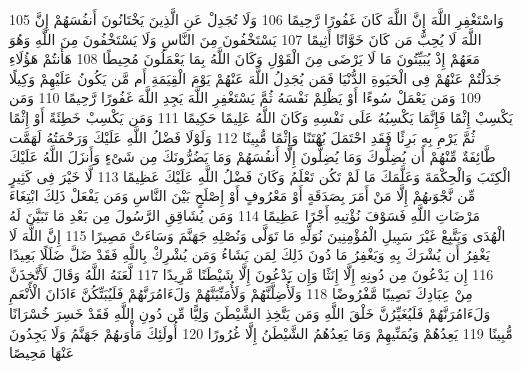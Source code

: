 {\tiny\colorbox{cl_aya}{105}} وَاسْتَغْفِرِ اللَّهَ إِنَّ اللَّهَ كَانَ غَفُورًا رَّحِيمًا
{\tiny\colorbox{cl_aya}{106}} وَلَا تُجَدِلْ عَنِ الَّذِينَ يَخْتَانُونَ أَنفُسَهُمْ إِنَّ اللَّهَ لَا يُحِبُّ مَن كَانَ خَوَّانًا أَثِيمًا
{\tiny\colorbox{cl_aya}{107}} يَسْتَخْفُونَ مِنَ النَّاسِ وَلَا يَسْتَخْفُونَ مِنَ اللَّهِ وَهُوَ مَعَهُمْ إِذْ يُبَيِّتُونَ مَا لَا يَرْضَى مِنَ الْقَوْلِ وَكَانَ اللَّهُ بِمَا يَعْمَلُونَ مُحِيطًا
{\tiny\colorbox{cl_aya}{108}} هَأَنتُمْ هَؤُلَاءِ جَدَلْتُمْ عَنْهُمْ فِى الْحَيَوةِ الدُّنْيَا فَمَن يُجَدِلُ اللَّهَ عَنْهُمْ يَوْمَ الْقِيَمَةِ أَم مَّن يَكُونُ عَلَيْهِمْ وَكِيلًا
{\tiny\colorbox{cl_aya}{109}} وَمَن يَعْمَلْ سُوءًا أَوْ يَظْلِمْ نَفْسَهُ ثُمَّ يَسْتَغْفِرِ اللَّهَ يَجِدِ اللَّهَ غَفُورًا رَّحِيمًا
{\tiny\colorbox{cl_aya}{110}} وَمَن يَكْسِبْ إِثْمًا فَإِنَّمَا يَكْسِبُهُ عَلَى نَفْسِهِ وَكَانَ اللَّهُ عَلِيمًا حَكِيمًا
{\tiny\colorbox{cl_aya}{111}} وَمَن يَكْسِبْ خَطِئَةً أَوْ إِثْمًا ثُمَّ يَرْمِ بِهِ بَرِئًا فَقَدِ احْتَمَلَ بُهْتَنًا وَإِثْمًا مُّبِينًا
{\tiny\colorbox{cl_aya}{112}} وَلَوْلَا فَضْلُ اللَّهِ عَلَيْكَ وَرَحْمَتُهُ لَهَمَّت طَّائِفَةٌ مِّنْهُمْ أَن يُضِلُّوكَ وَمَا يُضِلُّونَ إِلَّا أَنفُسَهُمْ وَمَا يَضُرُّونَكَ مِن شَىْءٍ وَأَنزَلَ اللَّهُ عَلَيْكَ الْكِتَبَ وَالْحِكْمَةَ وَعَلَّمَكَ مَا لَمْ تَكُن تَعْلَمُ وَكَانَ فَضْلُ اللَّهِ عَلَيْكَ عَظِيمًا
{\tiny\colorbox{cl_aya}{113}} لَّا خَيْرَ فِى كَثِيرٍ مِّن نَّجْوَىهُمْ إِلَّا مَنْ أَمَرَ بِصَدَقَةٍ أَوْ مَعْرُوفٍ أَوْ إِصْلَحٍ بَيْنَ النَّاسِ وَمَن يَفْعَلْ ذَلِكَ ابْتِغَاءَ مَرْضَاتِ اللَّهِ فَسَوْفَ نُؤْتِيهِ أَجْرًا عَظِيمًا
{\tiny\colorbox{cl_aya}{114}} وَمَن يُشَاقِقِ الرَّسُولَ مِن بَعْدِ مَا تَبَيَّنَ لَهُ الْهُدَى وَيَتَّبِعْ غَيْرَ سَبِيلِ الْمُؤْمِنِينَ نُوَلِّهِ مَا تَوَلَّى وَنُصْلِهِ جَهَنَّمَ وَسَاءَتْ مَصِيرًا
{\tiny\colorbox{cl_aya}{115}} إِنَّ اللَّهَ لَا يَغْفِرُ أَن يُشْرَكَ بِهِ وَيَغْفِرُ مَا دُونَ ذَلِكَ لِمَن يَشَاءُ وَمَن يُشْرِكْ بِاللَّهِ فَقَدْ ضَلَّ ضَلَلًا بَعِيدًا
{\tiny\colorbox{cl_aya}{116}} إِن يَدْعُونَ مِن دُونِهِ إِلَّا إِنَثًا وَإِن يَدْعُونَ إِلَّا شَيْطَنًا مَّرِيدًا
{\tiny\colorbox{cl_aya}{117}} لَّعَنَهُ اللَّهُ وَقَالَ لَأَتَّخِذَنَّ مِنْ عِبَادِكَ نَصِيبًا مَّفْرُوضًا
{\tiny\colorbox{cl_aya}{118}} وَلَأُضِلَّنَّهُمْ وَلَأُمَنِّيَنَّهُمْ وَلَءَامُرَنَّهُمْ فَلَيُبَتِّكُنَّ ءَاذَانَ الْأَنْعَمِ وَلَءَامُرَنَّهُمْ فَلَيُغَيِّرُنَّ خَلْقَ اللَّهِ وَمَن يَتَّخِذِ الشَّيْطَنَ وَلِيًّا مِّن دُونِ اللَّهِ فَقَدْ خَسِرَ خُسْرَانًا مُّبِينًا
{\tiny\colorbox{cl_aya}{119}} يَعِدُهُمْ وَيُمَنِّيهِمْ وَمَا يَعِدُهُمُ الشَّيْطَنُ إِلَّا غُرُورًا
{\tiny\colorbox{cl_aya}{120}} أُولَئِكَ مَأْوَىهُمْ جَهَنَّمُ وَلَا يَجِدُونَ عَنْهَا مَحِيصًا
